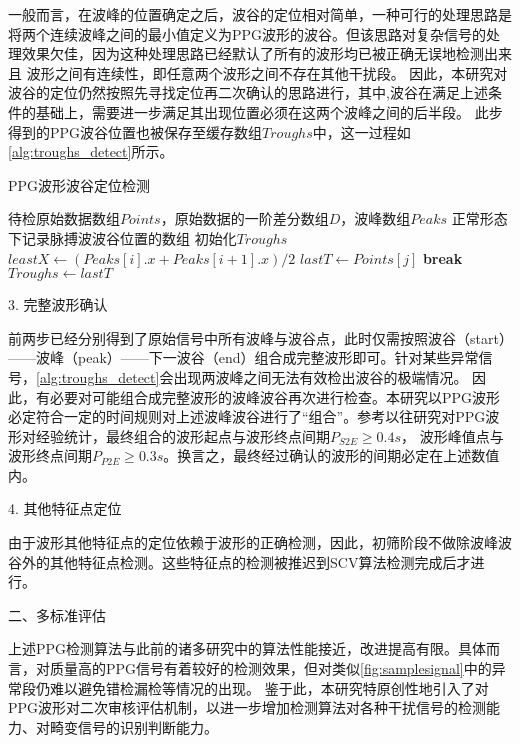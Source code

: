 一般而言，在波峰的位置确定之后，波谷的定位相对简单，一种可行的处理思路是将两个连续波峰之间的最小值定义为PPG波形的波谷。但该思路对复杂信号的处理效果欠佳，因为这种处理思路已经默认了所有的波形均已被正确无误地检测出来且
波形之间有连续性，即任意两个波形之间不存在其他干扰段。
因此，本研究对波谷的定位仍然按照先寻找定位再二次确认的思路进行，其中,波谷在满足上述条件的基础上，需要进一步满足其出现位置必须在这两个波峰之间的后半段。
此步得到的PPG波谷位置也被保存至缓存数组$Troughs$中，这一过程如\autoref{alg:troughs_detect}所示。
\begin{breakablealgorithm}
    \caption{PPG波形波谷定位检测}
    \label{alg:troughs_detect}
    \begin{algorithmic}[1] %
        \Require 待检原始数据数组$Points$，原始数据的一阶差分数组$D$，波峰数组$Peaks$
        \Ensure 正常形态下记录脉搏波波谷位置的数组
            \State 初始化$Troughs$
                \State $leastX \gets (Peaks[i].x + Peaks[i+1].x )/2$
                            \State $lastT \gets Points[j]$
                            \State \textbf{break}
                        \EndIf
                    \EndFor
                \State $Troughs \gets lastT$
            \EndFor
            \State {}
        \EndFunction
    \end{algorithmic}
\end{breakablealgorithm}

3. 完整波形确认

前两步已经分别得到了原始信号中所有波峰与波谷点，此时仅需按照波谷（start）——波峰（peak）——下一波谷（end）组合成完整波形即可。针对某些异常信号，\autoref{alg:troughs_detect}会出现两波峰之间无法有效检出波谷的极端情况。
因此，有必要对可能组合成完整波形的波峰波谷再次进行检查。本研究以PPG波形必定符合一定的时间规则对上述波峰波谷进行了“组合”。参考以往研究对PPG波形对经验统计，最终组合的波形起点与波形终点间期$P_{S2E}\ge 0.4s$，
波形峰值点与波形终点间期$P_{P2E}\ge 0.3s$。换言之，最终经过确认的波形的间期必定在上述数值内。

4. 其他特征点定位

由于波形其他特征点的定位依赖于波形的正确检测，因此，初筛阶段不做除波峰波谷外的其他特征点检测。这些特征点的检测被推迟到SCV算法检测完成后才进行。

二、多标准评估

上述PPG检测算法与此前的诸多研究中的算法性能接近，改进提高有限。具体而言，对质量高的PPG信号有着较好的检测效果，但对类似\autoref{fig:samplesignal}中的异常段仍难以避免错检漏检等情况的出现。
鉴于此，本研究特原创性地引入了对PPG波形对二次审核评估机制，以进一步增加检测算法对各种干扰信号的检测能力、对畸变信号的识别判断能力。

